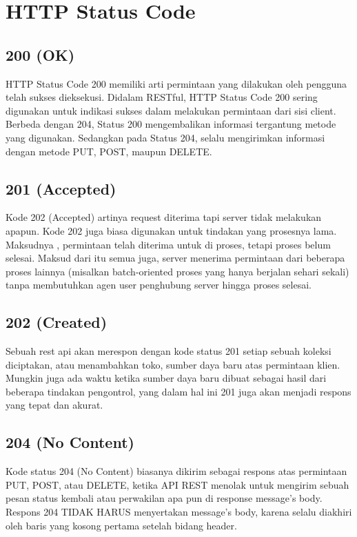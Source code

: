 \section{HTTP Status Code}
\subsection{200 (OK)}
HTTP Status Code 200 memiliki arti permintaan yang dilakukan oleh pengguna telah sukses dieksekusi. Didalam RESTful, HTTP Status Code 200 sering digunakan untuk indikasi sukses dalam melakukan permintaan dari sisi client. Berbeda dengan 204, Status 200 mengembalikan informasi tergantung metode yang digunakan.
Sedangkan pada Status 204, selalu mengirimkan informasi dengan metode PUT, POST, maupun DELETE.
\subsection{201 (Accepted)}
Kode 202 (Accepted) artinya request diterima tapi server tidak melakukan apapun. Kode 202 juga biasa digunakan untuk tindakan yang prosesnya lama. Maksudnya , permintaan telah diterima untuk di proses, tetapi proses belum selesai. 
Maksud dari itu semua juga, server menerima permintaan dari beberapa proses lainnya (misalkan batch-oriented proses yang hanya berjalan sehari sekali) tanpa membutuhkan agen user penghubung server hingga proses selesai.
\subsection{202 (Created)}
Sebuah rest api akan merespon dengan kode status 201 setiap sebuah koleksi diciptakan, atau menambahkan toko, sumber daya baru atas permintaan klien. Mungkin juga ada waktu ketika sumber daya baru dibuat sebagai hasil dari beberapa tindakan pengontrol, yang dalam hal ini 201 juga akan menjadi respons yang tepat dan akurat.
\subsection{204 (No Content)}
Kode status 204 (No Content) biasanya dikirim sebagai respons atas permintaan PUT, POST, atau DELETE, ketika API REST menolak untuk mengirim sebuah pesan status kembali atau perwakilan apa pun di response message’s body.\\
Respons 204 TIDAK HARUS menyertakan message’s body, karena selalu diakhiri oleh baris yang kosong pertama setelah bidang header.
